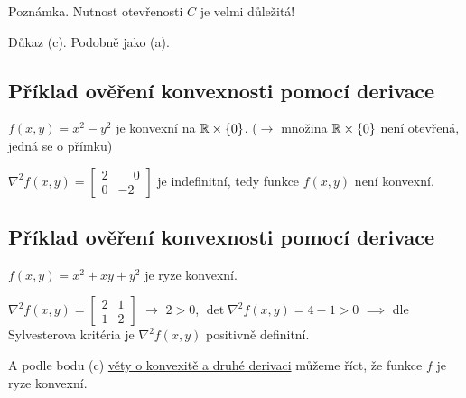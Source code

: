 Poznámka. Nutnost otevřenosti $C$ je velmi důležitá!

Důkaz (c). Podobně jako (a).

\subsection{Příklad ověření konvexnosti pomocí derivace}
$f(x, y) = x^2 - y^2$ je konvexní na $\mathbb{R} \times \left\lbrace 0 \right\rbrace$. ($\rightarrow$ množina $\mathbb{R} \times \left\lbrace 0 \right\rbrace$ není
otevřená, jedná se o přímku)

$\nabla^2 f(x, y) =
\begin{bmatrix}
    2 & \phantom{-}0 \\
    0 & -2
\end{bmatrix}$ je indefinitní, tedy funkce $f(x, y)$ není konvexní.

\subsection{Příklad ověření konvexnosti pomocí derivace}
$f(x, y) = x^2 + xy + y^2$ je ryze konvexní.

$\nabla^2 f(x, y) =
\begin{bmatrix}
    2 & 1 \\
    1 & 2
\end{bmatrix}$ $\rightarrow$ $2>0$, $\det \nabla^2 f(x,y) = 4-1>0$ $\implies$ dle Sylvesterova kritéria je
$\nabla^2 f(x,y)$ positivně definitní.

A podle bodu (c) \hyperref[konvDDeriv]{věty o konvexitě a druhé derivaci} můžeme říct, že funkce $f$ je ryze konvexní.
\newpage
